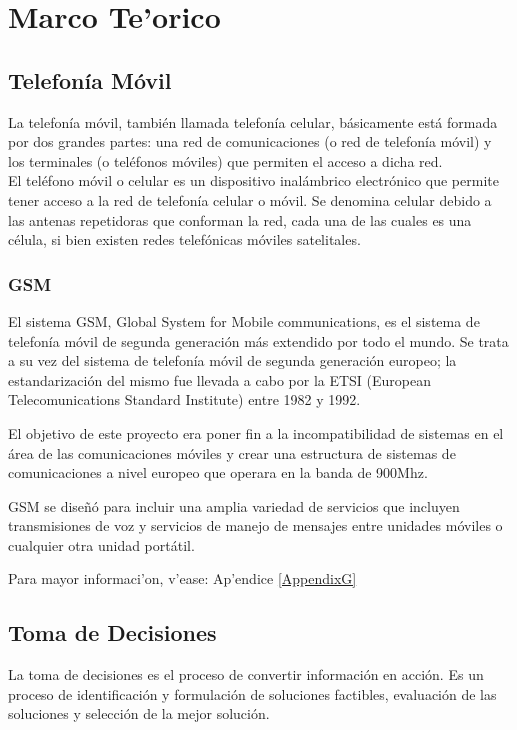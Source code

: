 \chapter{Marco Te'orico}
\label{chap:marcoTeorico}

\section{Telefon\'ia M\'ovil}
La telefon\'ia m\'ovil, tambi\'en llamada telefon\'ia celular, b\'asicamente est\'a formada por dos grandes partes: una red de comunicaciones (o red de telefon\'ia m\'ovil) y los terminales (o tel\'efonos m\'oviles) que permiten el acceso a dicha red.\\

El tel\'efono m\'ovil o celular es un dispositivo inal\'ambrico electr\'onico que permite tener acceso a la red de telefon\'ia celular o m\'ovil. Se denomina celular debido a las antenas repetidoras que conforman la red, cada una de las cuales es una c\'elula, si bien existen redes telef\'onicas m\'oviles satelitales.\\

\subsection{GSM}
El sistema GSM, Global System for Mobile communications, es el sistema de telefon\'ia m\'ovil de segunda generaci\'on m\'as extendido por todo el mundo. Se trata a su vez del sistema de telefon\'ia m\'ovil de segunda generaci\'on europeo; la estandarizaci\'on del mismo fue llevada a cabo por la ETSI (European Telecomunications Standard Institute) entre 1982 y 1992.\cite{OriolSallentRoig2003}

El objetivo de este proyecto era poner fin a la incompatibilidad de sistemas en el \'area de las comunicaciones m\'oviles y crear una estructura de sistemas de comunicaciones a nivel europeo que operara en la banda de 900Mhz. \cite{(IEC)}

GSM se dise\~n\'o para incluir una amplia variedad de servicios que incluyen transmisiones de voz y servicios de manejo de mensajes entre unidades m\'oviles o cualquier otra unidad port\'atil.\cite{ClavijoEnricForner;TorrentCuevas}

Para mayor informaci'on, v'ease: Ap'endice \ref{AppendixG}

\section{Toma de Decisiones}
La toma de decisiones es el proceso de convertir informaci\'on en acci\'on.  Es un proceso de identificaci\'on y formulaci\'on de soluciones factibles, evaluaci\'on de las soluciones y selecci\'on de la mejor soluci\'on.  \cite{MauricioEscudey(eds.)1997}

